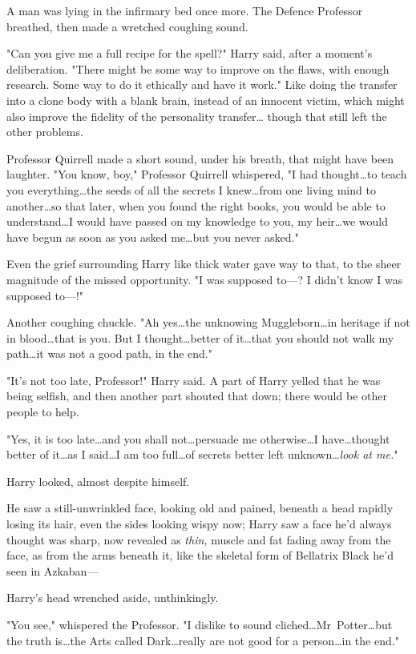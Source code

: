 A man was lying in the infirmary bed once more. The Defence Professor breathed,
then made a wretched coughing sound.

"Can you give me a full recipe for the spell?" Harry said, after a moment's
deliberation. "There might be some way to improve on the flaws, with enough
research. Some way to do it ethically and have it work." Like doing the
transfer into a clone body with a blank brain, instead of an innocent victim,
which might also improve the fidelity of the personality transfer…
though that still left the other problems.

Professor Quirrell made a short sound, under his breath, that might have been
laughter. "You know, boy," Professor Quirrell whispered, "I had thought…to
teach you everything…the seeds of all the secrets I knew…from
one living mind to another…so that later, when you found the right
books, you would be able to understand…I would have passed on my
knowledge to you, my heir…we would have begun as soon as you asked
me…but you never asked."

Even the grief surrounding Harry like thick water gave way to that, to the
sheer magnitude of the missed opportunity. "I was supposed to—? I didn't know
I was supposed to—!"

Another coughing chuckle. "Ah yes…the unknowing Muggleborn…in
heritage if not in blood…that is you. But I thought…better of
it…that you should not walk my path…it was not a good path, in
the end."

"It's not too late, Professor!" Harry said. A part of Harry yelled that he was
being selfish, and then another part shouted that down; there would be other
people to help.

"Yes, it is too late…and you shall not…persuade me
otherwise…I have…thought better of it…as I said…I
am too full…of secrets better left unknown…\emph{look at me.}"

Harry looked, almost despite himself.

He saw a still-unwrinkled face, looking old and pained, beneath a head rapidly
losing its hair, even the sides looking wispy now; Harry saw a face he'd always
thought was sharp, now revealed as \emph{thin,} muscle and fat fading away from
the face, as from the arms beneath it, like the skeletal form of Bellatrix
Black he'd seen in Azkaban—

Harry's head wrenched aside, unthinkingly.

"You see," whispered the Professor. "I dislike to sound cliched…Mr~Potter…but the
truth is…the Arts called Dark…really are not good for a person…in the end."

